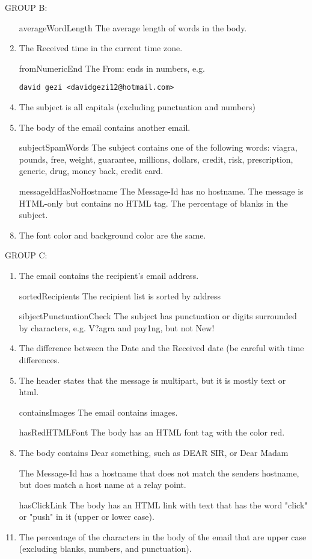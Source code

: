 \documentclass[12pt]{article}
\begin{document}
GROUP B:
\begin{enumerate}
\item[averageWordLength] The average length of words in the body.
\item The Received time in the current time zone.
\item[fromNumericEnd]  The From: ends in numbers, e.g. 
\begin{verbatim}
david gezi <davidgezi12@hotmail.com>
\end{verbatim}
\item The subject is all capitals (excluding punctuation and numbers)
\item The body of the email contains another email. 
\item[subjectSpamWords] The subject contains one of the following words:
viagra, pounds, free, weight, guarantee, millions, dollars,
credit, risk, prescription, generic, drug, money back, credit card.
\item[messageIdHasNoHostname] The Message-Id has no hostname.
\ite The message is HTML-only but contains no HTML tag.
\itemm[percentSubjectBlanks] The percentage of blanks in the subject.
\item The font color and background color are the same.
\end{enumerate}

GROUP C:
\begin{enumerate}
\item The email contains the recipient's email address. 
\item[sortedRecipients] The recipient list is sorted by address
\item[sibjectPunctuationCheck] The subject has punctuation or digits surrounded by characters,
e.g. V?agra and pay1ng, but not New!
\item  The difference between the Date and the Received date (be
careful with time differences.
\item The header states that the message is multipart,
but it is mostly text or html.
\item[containsImages] The email contains images.
\item[hasRedHTMLFont] The body has an HTML font tag with the color red.
\item The body contains Dear something, such as DEAR SIR, or Dear Madam
\item[] The Message-Id has a hostname that does not match the senders hostname,
but does match a host name at a relay point.
\item[hasClickLink] The body has an HTML link with text
that has the word "click" or "push" in it (upper or lower case).
\item The percentage of the characters in the body of the email that
are upper case (excluding blanks, numbers, and punctuation).
\end{enumerate}
\end{document}
